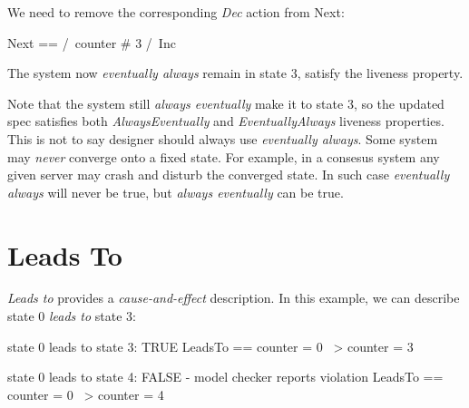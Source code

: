 We need to remove the corresponding \textit{Dec} action from Next:\\
\begin{tla}
Next ==
    /\ counter # 3
    /\ Inc
\end{tla}
\begin{tlatex}
%
%
%
\end{tlatex}
\newline 

The system now \textit{eventually always} remain in state 3, satisfy the 
liveness property.\newline 

Note that the system still \textit{always eventually} make it to state 3, so the
updated spec satisfies both \textit{AlwaysEventually} and
\textit{EventuallyAlways} liveness properties. This is not to say designer
should always use \textit{eventually always}. Some system may \textit{never}
converge onto a fixed state. For example, in a consesus system any given server
may crash and disturb the converged state. In such case \textit{eventually
always} will never be true, but \textit{always eventually} can be true.

\section{Leads To}

\textit{Leads to} provides a \textit{cause-and-effect} description. In this example, 
we can describe state 0 \textit{leads to} state 3:\newline
\begin{tla}
    \* state 0 leads to state 3: TRUE 
    LeadsTo == counter = 0 ~> counter = 3

    \* state 0 leads to state 4: FALSE - model checker reports violation
    LeadsTo == counter = 0 ~> counter = 4
\end{tla}
\begin{tlatex}
%
%
\@xx{}%
\@pvspace{8.0pt}%
%
%
\@xx{}%
\end{tlatex}
\newline

